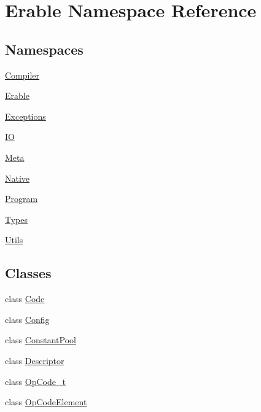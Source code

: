 \hypertarget{namespace_erable}{}\section{Erable Namespace Reference}
\label{namespace_erable}
\subsection*{Namespaces}
\begin{DoxyCompactItemize}
\item 
 \mbox{\hyperlink{namespace_erable_1_1_compiler}{Compiler}}
\item 
 \mbox{\hyperlink{namespace_erable_1_1_erable}{Erable}}
\item 
 \mbox{\hyperlink{namespace_erable_1_1_exceptions}{Exceptions}}
\item 
 \mbox{\hyperlink{namespace_erable_1_1_i_o}{IO}}
\item 
 \mbox{\hyperlink{namespace_erable_1_1_meta}{Meta}}
\item 
 \mbox{\hyperlink{namespace_erable_1_1_native}{Native}}
\item 
 \mbox{\hyperlink{namespace_erable_1_1_program}{Program}}
\item 
 \mbox{\hyperlink{namespace_erable_1_1_types}{Types}}
\item 
 \mbox{\hyperlink{namespace_erable_1_1_utils}{Utils}}
\end{DoxyCompactItemize}
\subsection*{Classes}
\begin{DoxyCompactItemize}
\item 
class \mbox{\hyperlink{class_erable_1_1_code}{Code}}
\item 
class \mbox{\hyperlink{class_erable_1_1_config}{Config}}
\item 
class \mbox{\hyperlink{class_erable_1_1_constant_pool}{Constant\+Pool}}
\item 
class \mbox{\hyperlink{class_erable_1_1_descriptor}{Descriptor}}
\item 
class \mbox{\hyperlink{class_erable_1_1_op_code__t}{Op\+Code\+\_\+t}}
\item 
class \mbox{\hyperlink{class_erable_1_1_op_code_element}{Op\+Code\+Element}}
\end{DoxyCompactItemize}
